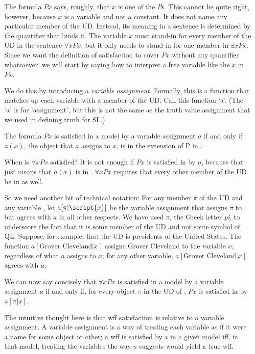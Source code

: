 The formula $Px$ says, roughly, that $x$ is one of the $P$s. This cannot be quite right, however, because $x$ is a variable and not a constant. It does not name any particular member of the UD. Instead, its meaning in a sentence is determined by the quantifier that binds it. The variable $x$ must stand-in for every member of the UD in the sentence $\forall xPx$, but it only needs to stand-in for one member in $\exists xPx$. Since we want the definition of satisfaction to cover $Px$ without any quantifier whatsoever, we will start by saying how to interpret a free variable like the $x$ in $Px$.

We do this by introducing a \emph{variable assignment}. Formally, this is a function that matches up each variable with a member of the UD. Call this function `a'. (The `a' is for `assignment', but this is not the same as the truth value assignment that we used in defining truth for SL.)

The formula $Px$ is satisfied in a model  by a variable assignment $a$ if and only if $a(x)$, the object that $a$ assigns to $x$, is in the  extension of P in .

When is $\forall x Px$ satisfied? It is not enough if $Px$ is satisfied in  by $a$, because that just means that $a(x)$ is in . $\forall x Px$ requires that every other member of the UD be in  as well.

So we need another bit of technical notation: For any member $\pi$ of the UD and any variable , let $a[\pi|\script{x}]$ be the variable assignment that assigns $\pi$ to  but agrees with $a$ in all other respects. We have used $\pi$, the Greek letter \emph{pi}, to underscore the fact that it is some member of the UD and not some symbol of QL. Suppose, for example, that the UD is presidents of the United States. The function $a[\mbox{Grover Cleveland}|x]$ assigns Grover Cleveland to the variable $x$, regardless of what $a$ assigns to $x$; for any other variable, $a[\mbox{Grover Cleveland}|x]$ agrees with $a$.

We can now say concisely that $\forall x Px$ is satisfied in a model  by a variable assignment $a$ if and only if, for every object $\pi$ in the UD of , $Px$ is satisfied in  by $a[\pi|x]$.

The intuitive thought here is that wff satisfaction is relative to a variable assignment. A variable assignment is a way of treating each variable as if it were a name for some object or other; a wff is satisfied by $a$ in a given model iff, in that model, treating the variables the way $a$ suggests would yield a true wff.

